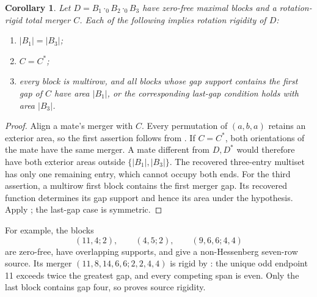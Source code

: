 \documentclass[11pt,a4paper]{amsart}
\numberwithin{equation}{section}
\theoremstyle{plain}
\newtheorem{corollary}[theorem]{Corollary}
\theoremstyle{definition}
\begin{document}
\begin{corollary}\label{cor:three-block-rigidity}
Let \(D=B_1\cdot_0B_2\cdot_0B_3\) have zero-free maximal blocks and a rotation-rigid total merger \(C\).  Each of the following implies rotation rigidity of \(D\):
\begin{enumerate}
\item \(|B_1|=|B_3|\);
\item \(C=C^*\);
\item every block is multirow, and all blocks whose gap support contains the first gap of \(C\) have area \(|B_1|\), or the corresponding last-gap condition holds with area \(|B_3|\).
\end{enumerate}
\end{corollary}
\begin{proof}
Align a mate's merger with \(C\).  Every permutation of \((a,b,a)\) retains an exterior area, so the first assertion follows from .  If \(C=C^*\), both orientations of the mate have the same merger.  A mate different from \(D,D^*\) would therefore have both exterior areas outside \(\{|B_1|,|B_3|\}\).  The recovered three-entry multiset has only one remaining entry, which cannot occupy both ends.  For the third assertion, a multirow first block contains the first merger gap.  Its recovered function determines its gap support and hence its area under the hypothesis.  Apply ; the last-gap case is symmetric.
\end{proof}

For example, the blocks
\[
 (11,4;2),\qquad(4,5;2),\qquad(9,6,6;4,4)
\]
are zero-free, have overlapping supports, and give a non-Hessenberg seven-row source.  Its merger \((11,8,14,6,6;2,2,4,4)\) is rigid by : the unique odd endpoint 11 exceeds twice the greatest gap, and every competing span is even.  Only the last block contains gap four, so  proves source rigidity.
\end{document}
